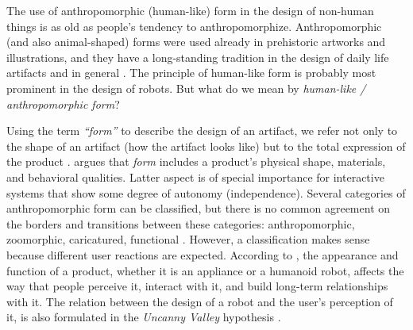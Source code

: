 \documentclass{frontiersSCNS} %
\begin{document}
The use of anthropomorphic (human-like) form in the design of non-human 
things is as old as people's tendency to anthropomorphize. Anthropomorphic (and 
also animal-shaped) forms were used already in prehistoric artworks and 
illustrations, and they have a long-standing tradition in the design of daily life 
artifacts and in general \citep{guthrie_bottles_2000}. The principle of human-like 
form is probably most prominent in the design of robots. But what do we mean by \textit{human-like / anthropomorphic form}?

Using the term \textit{``form''} to describe the design of an artifact, we refer 
not only to the shape of an artifact (how the artifact looks like) but to the total 
expression of the product \citep{bartneck_shaping_2004}. \cite{disalvo_hug:_2003} 
argues that \textit{form} includes a product's physical shape, materials, and 
behavioral qualities. Latter aspect is of special importance for interactive 
systems that show some degree of autonomy (independence).
Several categories of anthropomorphic form can be classified, but there is no 
common agreement on the borders and transitions between these categories: 
anthropomorphic, zoomorphic, caricatured, functional \citep{fong_survey_2003}. 
However, a classification makes sense because different user reactions are 
expected. According to \cite{bartneck_shaping_2004}, the appearance and function of 
a product, whether it is an appliance or a humanoid robot, affects the way that 
people perceive it, interact with it, and build long-term relationships with it. The relation between the design of a robot and the user's perception of it, is also formulated in the \textit{Uncanny Valley} hypothesis \citep{mori_uncanny_1970}.
\end{document}
